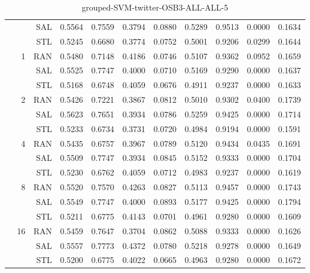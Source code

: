 \begin{center}
\begin{table}[htbp]
\begin{center}
\begin{tabular}{ | r | r | r | r | r | r | r | r | r | r | r |}
 &   & SAL & 0.5564 & 0.7559 & 0.3794 & 0.0880 & 0.5289 & 0.9513 & 0.0000 & 0.1634\\ \cline{3-11}
 &   & STL & 0.5245 & 0.6680 & 0.3774 & 0.0752 & 0.5001 & 0.9206 & 0.0299 & 0.1644\\ \cline{2-11}
 & \multirow{3}{*}{1} & RAN & 0.5480 & 0.7148 & 0.4186 & 0.0746 & 0.5107 & 0.9362 & 0.0952 & 0.1659\\ \cline{3-11}
 &   & SAL & 0.5525 & 0.7747 & 0.4000 & 0.0710 & 0.5169 & 0.9290 & 0.0000 & 0.1637\\ \cline{3-11}
 &   & STL & 0.5168 & 0.6748 & 0.4059 & 0.0676 & 0.4911 & 0.9237 & 0.0000 & 0.1633\\ \cline{2-11}
 & \multirow{3}{*}{2} & RAN & 0.5426 & 0.7221 & 0.3867 & 0.0812 & 0.5010 & 0.9302 & 0.0400 & 0.1739\\ \cline{3-11}
 &   & SAL & 0.5623 & 0.7651 & 0.3934 & 0.0786 & 0.5259 & 0.9425 & 0.0000 & 0.1714\\ \cline{3-11}
 &   & STL & 0.5233 & 0.6734 & 0.3731 & 0.0720 & 0.4984 & 0.9194 & 0.0000 & 0.1591\\ \cline{2-11}
 & \multirow{3}{*}{4} & RAN & 0.5435 & 0.6757 & 0.3967 & 0.0789 & 0.5120 & 0.9434 & 0.0435 & 0.1691\\ \cline{3-11}
 &   & SAL & 0.5509 & 0.7747 & 0.3934 & 0.0845 & 0.5152 & 0.9333 & 0.0000 & 0.1704\\ \cline{3-11}
 &   & STL & 0.5230 & 0.6762 & 0.4059 & 0.0712 & 0.4983 & 0.9237 & 0.0000 & 0.1619\\ \cline{2-11}
 & \multirow{3}{*}{8} & RAN & 0.5520 & 0.7570 & 0.4263 & 0.0827 & 0.5113 & 0.9457 & 0.0000 & 0.1743\\ \cline{3-11}
 &   & SAL & 0.5549 & 0.7747 & 0.4000 & 0.0893 & 0.5177 & 0.9425 & 0.0000 & 0.1794\\ \cline{3-11}
 &   & STL & 0.5211 & 0.6775 & 0.4143 & 0.0701 & 0.4961 & 0.9280 & 0.0000 & 0.1609\\ \cline{2-11}
 & \multirow{3}{*}{16} & RAN & 0.5459 & 0.7647 & 0.3704 & 0.0862 & 0.5088 & 0.9333 & 0.0000 & 0.1626\\ \cline{3-11}
 &   & SAL & 0.5557 & 0.7773 & 0.4372 & 0.0780 & 0.5218 & 0.9278 & 0.0000 & 0.1649\\ \cline{3-11}
 &   & STL & 0.5200 & 0.6775 & 0.4022 & 0.0665 & 0.4963 & 0.9280 & 0.0000 & 0.1672\\ \cline{2-11}
\hline
\end{tabular}
\caption{grouped-SVM-twitter-OSB3-ALL-ALL-5}
\end{center}
 \end{table}
\end{center}

